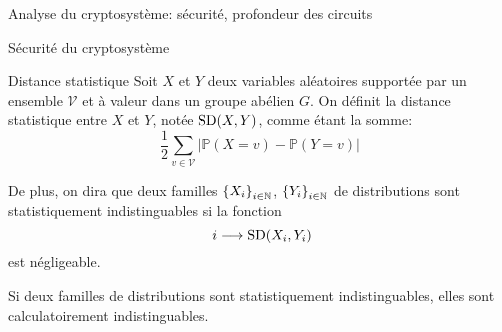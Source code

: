 \begin{section}{Analyse du cryptosystème: sécurité, profondeur des circuits}
	\begin{subsection}{Sécurité du cryptosystème}

	\begin{definition}{Distance statistique}
	Soit $X$ et $Y$ deux variables aléatoires supportée par
	un ensemble $\mathcal{V}$ et à valeur 
	dans un groupe abélien $G$. On définit la distance 
	statistique entre $X$ et $Y$, notée $\text{SD}(X,Y)$, 
	comme étant la somme:
	\[ \frac{1}{2} \sum_{v \in \mathcal{V}} |\mathbb{P}(X = v) -
	\mathbb{P}(Y = v)| \]

	De plus, on dira que deux familles ${\{X_i\}}_{i \in \mathbb{N}}$, ${\{Y_i\}}_{i \in \mathbb{N}}$
	de distributions sont statistiquement indistinguables si 
	la fonction 
	\[ i \longrightarrow \SD(X_i, Y_i) \]
	est négligeable.

	\end{definition}
	\begin{prop}
	Si deux familles de distributions sont statistiquement
	indistinguables, elles sont calculatoirement indistinguables.
	\end{prop}


\end{subsection}
\end{section}
